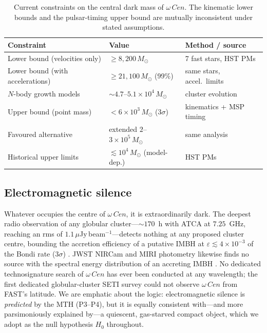 \documentclass[11pt]{article}
\newcommand{\msun}{M_\odot}
\newcommand{\acen}{\ensuremath{\omega}\,Cen}
\begin{document}
\begin{table}[t]
\centering
\caption{Current constraints on the central dark mass of $\acen$. The kinematic lower bounds and the pulsar-timing upper bound are mutually inconsistent under stated assumptions.}
\label{tab:masstension}
\small
\begin{tabular}{@{}lll@{}}
\toprule
Constraint & Value & Method / source \\
\midrule
Lower bound (velocities only) & $\ge 8{,}200\,\msun$ & 7 fast stars, HST PMs \citep{haberle2024a} \\
Lower bound (with accelerations) & $\ge 21{,}100\,\msun$ (99\%) & same stars, accel.\ limits \citep{haberle2024a} \\
$N$-body growth models & ${\sim}4.7$--$5.1\times10^{4}\,\msun$ & cluster evolution \citep{gonzalez2025} \\
Upper bound (point mass) & $< 6\times10^{3}\,\msun$ ($3\sigma$) & kinematics + MSP timing \citep{banares2025} \\
Favoured alternative & extended $2$--$3\times10^{5}\,\msun$ & same analysis \citep{banares2025} \\
Historical upper limits & $\lesssim 10^{4}\,\msun$ (model-dep.) & HST PMs \citep{vandermarel2010,zocchi2019} \\
\bottomrule
\end{tabular}
\end{table}

\subsection{Electromagnetic silence}
Whatever occupies the centre of $\acen$, it is extraordinarily dark. The deepest radio observation of any globular cluster---${\sim}170$~h with ATCA at $7.25$~GHz, reaching an rms of $1.1\,\mu$Jy\,beam$^{-1}$---detects nothing at any proposed cluster centre, bounding the accretion efficiency of a putative IMBH at $\varepsilon \lesssim 4\times10^{-3}$ of the Bondi rate ($3\sigma$) \citep{mahida2026}. JWST NIRCam and MIRI photometry likewise finds no source with the spectral energy distribution of an accreting IMBH \citep{chen2025}. No dedicated technosignature search of $\acen$ has ever been conducted at any wavelength; the first dedicated globular-cluster SETI survey \citep{huang2026} could not observe $\acen$ from FAST's latitude. We are emphatic about the logic: electromagnetic silence is \emph{predicted} by the MTH (P3--P4), but it is equally consistent with---and more parsimoniously explained by---a quiescent, gas-starved compact object, which we adopt as the null hypothesis $H_0$ throughout.
\end{document}
